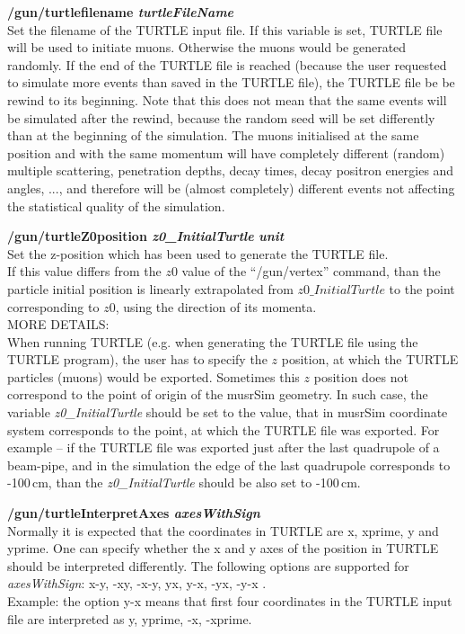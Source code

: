\documentclass[twoside]{dis04}
\begin{document}
\begin{description}
\item{\bf /gun/turtlefilename \emph{turtleFileName}}\\
	Set the filename of the TURTLE input file.  If this variable is set, TURTLE file 
        will be used to initiate muons.  Otherwise the muons would be generated randomly.
	If the end of the TURTLE file is reached (because the user requested to simulate
	more events than saved in the TURTLE file), the TURTLE file be be rewind to its
	beginning.  Note that this does not mean that the same events will be simulated
	after the rewind, because the random seed will be set differently than at the
	beginning of the simulation.  The muons initialised
	at the same position and with the same momentum will have completely different
	(random) multiple scattering, penetration depths, decay times,
	decay positron energies and angles, ..., and therefore will be (almost completely) 
	different events not affecting the statistical quality of the simulation.

\item{\bf /gun/turtleZ0position  \emph{z0\_InitialTurtle}  \emph{unit}}\\
	Set the z-position which has been used to generate the TURTLE file.\\
	If this value differs from the $z0$ value of the ``/gun/vertex'' command,
	than the particle initial position is linearly extrapolated from $z0\_InitialTurtle$ 
	to the point corresponding to $z0$, using the direction of its momenta.\\
	MORE DETAILS:\\
	When running TURTLE (e.g. when generating the TURTLE file using the TURTLE program),
	the user has to specify the $z$ position, at which the TURTLE particles (muons) would be exported.
	Sometimes this $z$ position does not correspond to the point of origin of the musrSim
	geometry.  In such case, the variable \emph{z0\_InitialTurtle} should be set to the
	value, that in musrSim coordinate system corresponds to the point, at which the TURTLE
	file was exported.  For example -- if the TURTLE file was exported just after the last
	quadrupole of a beam-pipe, and in the simulation the edge of the last quadrupole corresponds
	to -100\,cm, than the \emph{z0\_InitialTurtle} should be also set to -100\,cm.\\
	
\item{\bf /gun/turtleInterpretAxes \emph{axesWithSign}}\\
        Normally it is expected that the coordinates in TURTLE are x, xprime, y and yprime.
        One can specify whether the x and y axes of the position in TURTLE should be interpreted differently.
        The following options are supported for \emph{axesWithSign}:  x-y, -xy, -x-y, yx, y-x, -yx, -y-x .\\
        Example: the option y-x means that first four coordinates in the TURTLE input file
                 are interpreted as  y, yprime, -x, -xprime.


\end{description}
\end{document}
